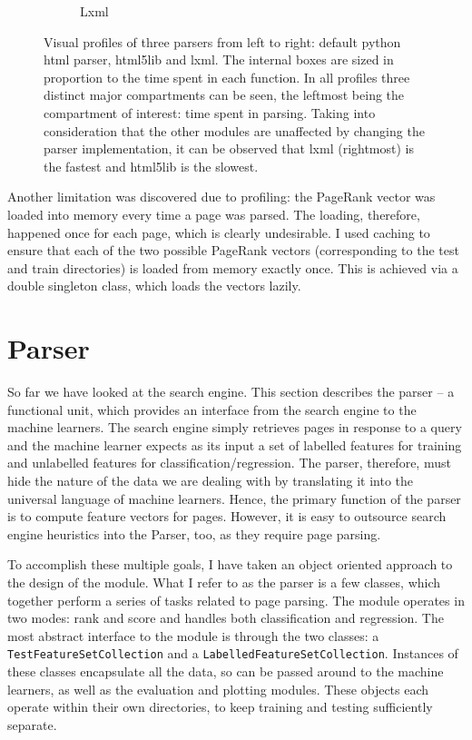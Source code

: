 \documentclass[12pt,notitlepage,twoside]{scrreprt}
\begin{document}
\begin{figure}[h!]
\begin{subfigure}[b]{.3\textwidth}
  \caption{Lxml}
  \label{lxml}
\end{subfigure}
\caption{Visual profiles of three parsers from left to right: default python
html parser, html5lib and lxml. The internal boxes are sized in proportion to
the time spent in each function. In all profiles three distinct major
compartments can be seen, the leftmost being the compartment of interest: 
time spent in parsing. Taking into consideration that the other modules are unaffected by changing the parser
implementation, it can be observed that lxml (rightmost) is the fastest and
html5lib is the slowest.\label{parsers}}
\end{figure}

Another limitation was discovered due to profiling: the PageRank vector
was loaded into memory every time a page was parsed. The loading, therefore, happened once for each page, which
is clearly undesirable. I used caching to ensure that each of the two possible
PageRank vectors (corresponding to the test and train directories) is loaded
from memory exactly once. This is achieved via a double singleton class, which
loads the vectors lazily.


\section{Parser}
\label{sec:parser}
So far we have looked at the search engine. This section describes the parser -- a
functional unit, which provides an interface from the search engine to the machine
learners.  The search engine simply retrieves pages in response to a query and the machine
learner expects as its input a set of labelled features for training and unlabelled
features for classification/regression.  The parser, therefore, must hide the nature of
the data we are dealing with by translating it into the universal language of machine
learners. Hence, the primary function of the parser is to compute feature vectors for
pages.  However, it is easy to outsource search engine heuristics into the Parser, too, as
they require page parsing. 

To accomplish these multiple goals, I have
taken an object oriented approach to the design of the module. What I refer to
as the parser is a few classes, which together perform a series of tasks
related to page parsing.  The module operates in two modes: rank and score and
handles both classification and regression. The most abstract interface to the module is through the two
classes: a \texttt{TestFeatureSetCollection} and a
\texttt{LabelledFeatureSetCollection}. Instances of these classes encapsulate all the data,
so can be passed around to the machine learners, as well as the evaluation and
plotting modules. These objects each operate within their own directories, to
keep training and testing sufficiently separate.
\end{document}
